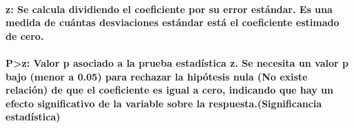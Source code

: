 \documentclass[11pt]{article}
\begin{document}
    \paragraph{z: Se calcula dividiendo el coeficiente por su error
estándar. Es una medida de cuántas desviaciones estándar está el
coeficiente estimado de
cero.}\label{z-se-calcula-dividiendo-el-coeficiente-por-su-error-estuxe1ndar.-es-una-medida-de-cuuxe1ntas-desviaciones-estuxe1ndar-estuxe1-el-coeficiente-estimado-de-cero.}

    \paragraph{P\textgreater\textbar z\textbar: Valor p asociado a la prueba
estadística z. Se necesita un valor p bajo (menor a 0.05) para rechazar
la hipótesis nula (No existe relación) de que el coeficiente es igual a
cero, indicando que hay un efecto significativo de la variable sobre la
respuesta.(Significancia
estadística)}\label{pz-valor-p-asociado-a-la-prueba-estaduxedstica-z.-se-necesita-un-valor-p-bajo-menor-a-0.05-para-rechazar-la-hipuxf3tesis-nula-no-existe-relaciuxf3n-de-que-el-coeficiente-es-igual-a-cero-indicando-que-hay-un-efecto-significativo-de-la-variable-sobre-la-respuesta.significancia-estaduxedstica}
\end{document}
